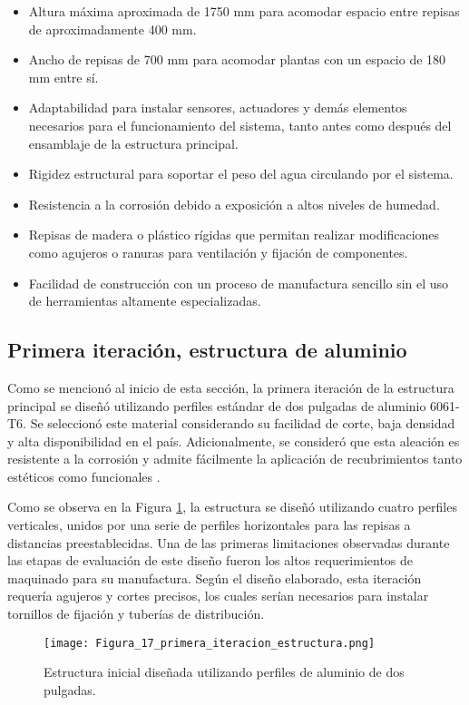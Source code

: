 \begin{itemize}
	\item Altura máxima aproximada de 1750 mm para acomodar espacio entre repisas de aproximadamente 400 mm.
	\item Ancho de repisas de 700 mm para acomodar plantas con un espacio de 180 mm entre sí.
	\item Adaptabilidad para instalar sensores, actuadores y demás elementos necesarios para el funcionamiento del sistema, tanto antes como después del ensamblaje de la estructura principal.
	\item Rigidez estructural para soportar el peso del agua circulando por el sistema.
	\item Resistencia a la corrosión debido a exposición a altos niveles de humedad.
	\item Repisas de madera o plástico rígidas que permitan realizar modificaciones como agujeros o ranuras para ventilación y fijación de componentes.
	\item Facilidad de construcción con un proceso de manufactura sencillo sin el uso de herramientas altamente especializadas.
\end{itemize}

\subsection{Primera iteración, estructura de aluminio}

Como se mencionó al inicio de esta sección, la primera iteración de la estructura principal se diseñó utilizando perfiles estándar de dos pulgadas de aluminio 6061-T6. Se seleccionó este material considerando su facilidad de corte, baja densidad y alta disponibilidad en el país. Adicionalmente, se consideró que esta aleación es resistente a la corrosión y admite fácilmente la aplicación de recubrimientos tanto estéticos como funcionales \cite{matweb_al6061_T6}. 

Como se observa en la Figura \ref{fig:alumin}, la estructura se diseñó utilizando cuatro perfiles verticales, unidos por una serie de perfiles horizontales para las repisas a distancias preestablecidas. Una de las primeras limitaciones observadas durante las etapas de evaluación de este diseño fueron los altos requerimientos de maquinado para su manufactura. Según el diseño elaborado, esta iteración requería agujeros y cortes precisos, los cuales serían necesarios para instalar tornillos de fijación y tuberías de distribución.

\begin{figure}[H]
	\centering
	\texttt{[image: Figura\_17\_primera\_iteracion\_estructura.png]}
	\caption{Estructura inicial diseñada utilizando perfiles de aluminio de dos pulgadas.}
	\label{fig:alumin}
\end{figure}

